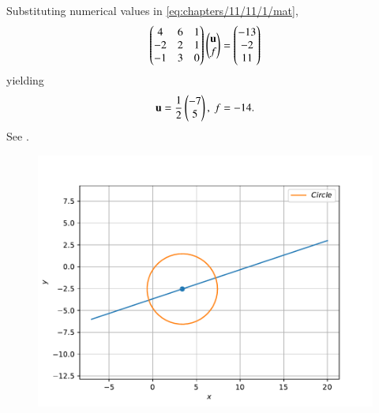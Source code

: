Substituting numerical values in 
	\eqref{eq:chapters/11/11/1/mat},
\begin{align}
	\label{eq:vertex_system}
	\begin{pmatrix}4&6&1\\-2& 2&1\\-1& 3&0\end{pmatrix}\begin{pmatrix}\mathbf{u}\\f\end{pmatrix} = \begin{pmatrix}-13\\-2 \\11\end{pmatrix}
\end{align}
yielding
\begin{align}
	\mathbf{u}=\frac{1}{2}\begin{pmatrix}-7 \\5\end{pmatrix},\
f=-14.
\end{align}
See 
		.
	\begin{figure}[!ht]
		\centering
 \includegraphics[width=\columnwidth]{chapters/11/11/1/11/figs/fig.pdf}
		\caption{}
		\label{fig:11/11/1/11}
  	\end{figure}
